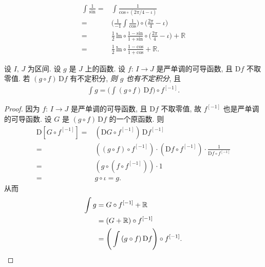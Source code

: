 \begin{example}
    \begin{align*}
        \int {\frac{1}{\mathrm{sin}}}
        = {} & \int {\frac{1}{\mathrm{cos} \circ (2\pi/4 - \iota)}}                     \\
        = {} & \Bigg( \frac{1}{-1} \int {\frac{1}{\mathrm{cos}}} \Bigg)
        \circ \bigg( \frac{2\pi}{4} - \iota \bigg)                                      \\
        = {} & \frac{1}{2}\,\mathrm{ln} \circ
        \frac{1 - \mathrm{sin}}{1 + \mathrm{sin}} \circ
        \bigg( \frac{2\pi}{4} - \iota \bigg) + \mathbb{R}                               \\
        = {} & \frac{1}{2}\,\mathrm{ln} \circ \frac{1 - \mathrm{cos}}{1 + \mathrm{cos}}
        + \mathbb{R}.
    \end{align*}
\end{example}

\begin{theorem}
    设 $I$, $J$ 为区间. 设 $g$ 是 $J$ 上的函数. 设 $f$: $I \to J$ 是严单调的可导函数, 且 $\mathrm{D}f$ 不取零值. 若 $(g \circ f)\,\mathrm{D}f$ 有不定积分, \emph{则 $g$ 也有不定积分}, 且
    \begin{align*}
        \int {g} = \Bigg( \int {(g \circ f)\,\mathrm{D}f} \Bigg) \circ f^{[-1]}.
    \end{align*}
\end{theorem}

\begin{proof}
    因为 $f$: $I \to J$ 是严单调的可导函数, 且 $\mathrm{D}f$ 不取零值, 故 $f^{[-1]}$ 也是严单调的可导函数. 设 $G$ 是 $(g \circ f)\,\mathrm{D}f$ 的一个原函数. 则
    \begin{align*}
        \mathrm{D}[G \circ f^{[-1]}]
        = {} & (\mathrm{D}G \circ f^{[-1]})\, \mathrm{D}f^{[-1]}                                                         \\
        = {} & ((g \circ f)\circ f^{[-1]}) \cdot (\mathrm{D}f \circ f^{[-1]}) \cdot \frac{1}{\mathrm{D}f \circ f^{[-1]}} \\
        = {} & (g \circ (f \circ f^{[-1]})) \cdot 1                                                                      \\
        = {} & g \circ \iota = g.
    \end{align*}
    从而
    \begin{align*}
        \int {g}
        = {} & G \circ f^{[-1]} + \mathbb{R}                                          \\
        = {} & (G + \mathbb{R}) \circ f^{[-1]}                                        \\
        = {} & \Bigg( \int {(g \circ f)\,\mathrm{D}f} \Bigg) \circ f^{[-1]}. \qedhere
    \end{align*}
\end{proof}

